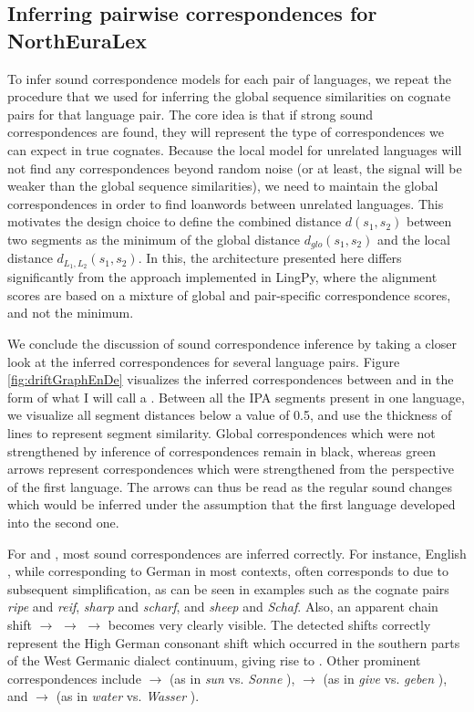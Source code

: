 \subsection{Inferring pairwise correspondences for NorthEuraLex}
To infer sound correspondence models for each pair of languages, we repeat the procedure that we
used for inferring the global sequence similarities on cognate pairs for that language pair.
The core idea is that if strong sound correspondences are found, they will represent the
type of correspondences we can expect in true cognates. Because the local model for unrelated
languages will not find any correspondences beyond random noise (or at least, the signal will
be weaker than the global sequence similarities), we need to maintain the global correspondences
in order to find loanwords between unrelated languages. This motivates the design choice
to define the combined distance $d(s_1,s_2)$ between two segments as the minimum
of the global distance $d_{glo}(s_1,s_2)$ and the local distance $d_{L_1,L_2}(s_1,s_2)$.
In this, the architecture presented here differs significantly from the approach implemented
in LingPy, where the alignment scores are based on a mixture of global and pair-specific
correspondence scores, and not the minimum.

We conclude the discussion of sound correspondence inference by taking a closer look at the inferred correspondences for several language pairs. Figure \ref{fig:driftGraphEnDe} visualizes the inferred correspondences between  and  in the form of what I will call a \textit{}. Between all the IPA segments present in one language, we visualize all segment distances below a value of 0.5, and use the thickness of lines to represent segment similarity. Global correspondences which were not strengthened by inference of correspondences remain in black, whereas green arrows represent correspondences which were strengthened from the perspective of the first language. The arrows can thus be read as the regular sound changes which would be inferred under the assumption that the first language developed into the second one.

For  and , most sound correspondences are inferred correctly. For instance, English \ipa{[p]}, while corresponding to German \ipa{[\t{pf}]} in most contexts, often corresponds to \ipa{[f]} due to subsequent simplification, as can be seen in examples such as the cognate pairs \textit{ripe} and \textit{reif}, \textit{sharp} and \textit{scharf}, and \textit{sheep} and \textit{Schaf}. Also, an apparent chain shift \ipa{[D]} $\rightarrow$ \ipa{[d]} $\rightarrow$ \ipa{[t]} $\rightarrow$ \ipa{[\t{ts}]} becomes very clearly visible. The detected shifts correctly represent the High German consonant shift which occurred in the southern parts of the West Germanic dialect continuum, giving rise to . Other prominent correspondences include \ipa{[s]} $\rightarrow$ \ipa{[z]} (as in \textit{sun} \ipa{[s2n]} vs. \textit{Sonne} \ipa{[zOn@]}), \ipa{[v]} $\rightarrow$ \ipa{[b]} (as in \textit{give} \ipa{[gIv]} vs. \textit{geben} \ipa{[ge:b@n]}), and \ipa{[w]} $\rightarrow$ \ipa{[v]} 
(as in \textit{water} \ipa{[wO:t@]} vs. \textit{Wasser} \ipa{[vas5]}).

